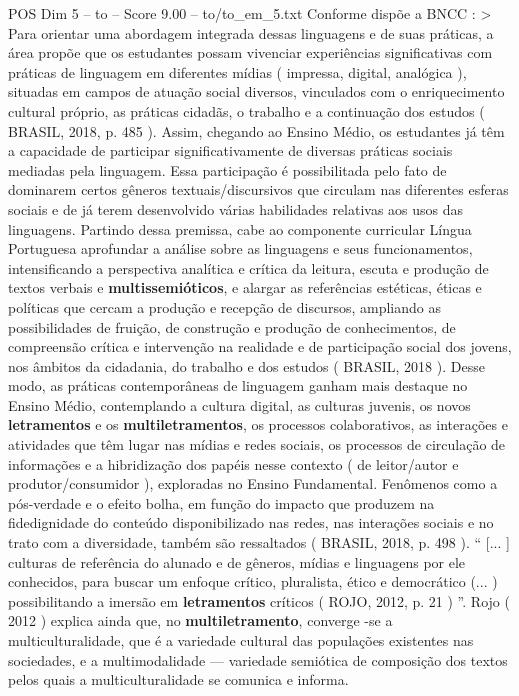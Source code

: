 \begin{textsample}{POS Dim 5 – to – Score 9.00 – to/to\_em\_5.txt}
Conforme dispõe a BNCC : > Para orientar uma abordagem integrada dessas linguagens e de suas práticas, a área propõe que os estudantes possam vivenciar experiências significativas com práticas de linguagem em diferentes mídias ( impressa, digital, analógica ), situadas em campos de atuação social diversos, vinculados com o enriquecimento cultural próprio, as práticas cidadãs, o trabalho e a continuação dos estudos ( BRASIL, 2018, p. 485 ).
Assim, chegando ao Ensino Médio, os estudantes já têm a capacidade de participar significativamente de diversas práticas sociais mediadas pela linguagem.
Essa participação é possibilitada pelo fato de dominarem certos gêneros textuais/discursivos que circulam nas diferentes esferas sociais e de já terem desenvolvido várias habilidades relativas aos usos das linguagens.
Partindo dessa premissa, cabe ao componente curricular Língua Portuguesa aprofundar a análise sobre as linguagens e seus funcionamentos, intensificando a perspectiva analítica e crítica da leitura, escuta e produção de textos verbais e \textbf{multissemióticos}, e alargar as referências estéticas, éticas e políticas que cercam a produção e recepção de discursos, ampliando as possibilidades de fruição, de construção e produção de conhecimentos, de compreensão crítica e intervenção na realidade e de participação social dos jovens, nos âmbitos da cidadania, do trabalho e dos estudos ( BRASIL, 2018 ).
Desse modo, as práticas contemporâneas de linguagem ganham mais destaque no Ensino Médio, contemplando a cultura digital, as culturas juvenis, os novos \textbf{letramentos} e os \textbf{multiletramentos}, os processos colaborativos, as interações e atividades que têm lugar nas mídias e redes sociais, os processos de circulação de informações e a hibridização dos papéis nesse contexto ( de leitor/autor e produtor/consumidor ), exploradas no Ensino Fundamental.
Fenômenos como a pós-verdade e o efeito bolha, em função do impacto que produzem na fidedignidade do conteúdo disponibilizado nas redes, nas interações sociais e no trato com a diversidade, também são ressaltados ( BRASIL, 2018, p. 498 ). “ [... ] culturas de referência do alunado e de gêneros, mídias e linguagens por ele conhecidos, para buscar um enfoque crítico, pluralista, ético e democrático (... ) possibilitando a imersão em \textbf{letramentos} críticos ( ROJO, 2012, p. 21 ) ”.
Rojo ( 2012 ) explica ainda que, no \textbf{multiletramento}, converge -se a multiculturalidade, que é a variedade cultural das populações existentes nas sociedades, e a multimodalidade — variedade semiótica de composição dos textos pelos quais a multiculturalidade se comunica e informa.

\end{textsample}
